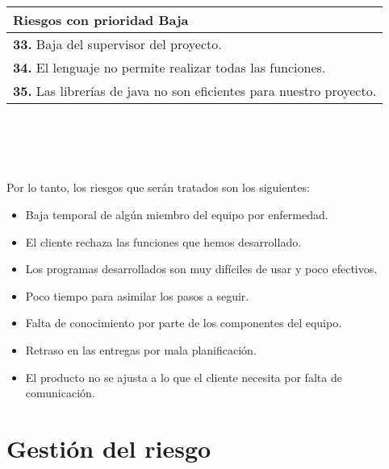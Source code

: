 \documentclass[spanish,a4paper,11pt, twoside]{report}	%
\begin{document}
			\begin{tabular}{|p{12cm}|}
				\hline
				\textbf{Riesgos con prioridad Baja}\\ \hline \hline
				\textbf{33.} Baja del supervisor del proyecto.\\ \hline 
				\textbf{34.} El lenguaje no permite realizar todas las funciones.\\ \hline
				\textbf{35.} Las librerías de java no son eficientes para nuestro proyecto. \\ \hline
			\end{tabular}
			\ \\
			\ \\
			\ \\
			\ \\
			Por lo tanto, los riesgos que serán tratados son los siguientes:
			\begin{itemize}
			  \item Baja temporal de algún miembro del equipo por enfermedad.
			  \item El cliente rechaza las funciones que hemos desarrollado.
			  \item Los programas desarrollados son muy difíciles de usar y poco efectivos.
			  \item Poco tiempo para asimilar los pasos a seguir. 
			  \item Falta de conocimiento por parte de los componentes del equipo. 
			  \item Retraso en las entregas por mala planificación. 
			  \item El producto no se ajusta a lo que el cliente necesita por falta de comunicación. 
			\end{itemize}
			

 
\newpage
\mbox{}
\thispagestyle{empty}						%
\newpage
 
\part{Gestión del riesgo}
\end{document}
